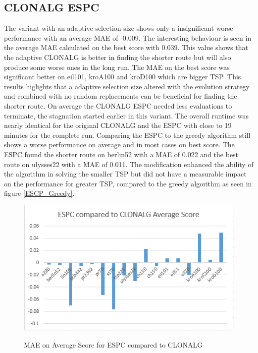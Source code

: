 \subsection{CLONALG ESPC}
The variant with an adaptive selection size shows only a insignificant worse performance with an average MAE of -0.009. The interesting behaviour is seen in the average MAE calculated on the best score with 0.039. This value shows that the adaptive CLONALG is better in finding the shorter route but will also produce some worse ones in the long run. The MAE on the best score was significant better on eil101, kroA100 and kroD100 which are bigger TSP. This results higlights that a adaptive selection size altered with the evolution strategy and combined with no random replacements can be beneficial for finding the shorter route. On average the CLONALG ESPC needed less evaluations to terminate, the stagnation started earlier in this variant. The overall runtime was nearly identical for the original CLONALG and the ESPC with close to 19 minutes for the complete run. Comparing the ESPC to the greedy algorithm still shows a worse performance on average and in most cases on best score. The ESPC found the shorter route on berlin52 with a MAE of 0.022 and the best route on ulysses22 with a MAE of 0.011. The modification enhanced the ability of the algorithm in solving the smaller TSP but did not have a measurable impact on the performance for greater TSP, compared to the greedy algorithm as seen in figure \ref{ESCP_Greedy}.\\
\begin{figure}[h]
\includegraphics[]{Images/ESPC_Fig_Avg.png}
\label{ESCP_AVG}
\caption{MAE on Average Score for ESPC compared to CLONALG}
\end{figure}
